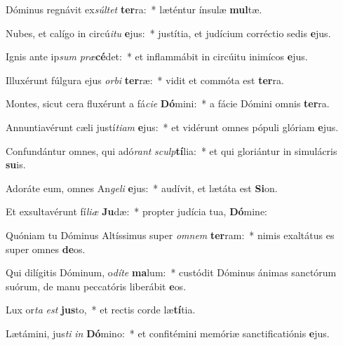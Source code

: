 \item Dóminus regnávit ex\textit{súl}\textit{tet} \textbf{ter}ra:~* læténtur ínsulæ \textbf{mul}tæ.
\item Nubes, et calígo in circú\textit{i}\textit{tu} \textbf{e}jus:~* justítia, et judícium corréctio sedis \textbf{e}jus.
\item Ignis ante ip\textit{sum} \textit{præ}\textbf{cé}det:~* et inflammábit in circúitu inimícos \textbf{e}jus.
\item Illuxérunt fúlgura ejus \textit{or}\textit{bi} \textbf{ter}ræ:~* vidit et commóta est \textbf{ter}ra.
\item Montes, sicut cera fluxérunt a fá\textit{ci}\textit{e} \textbf{Dó}mini:~* a fácie Dómini omnis \textbf{ter}ra.
\item Annuntiavérunt cæli justí\textit{ti}\textit{am} \textbf{e}jus:~* et vidérunt omnes pópuli glóriam \textbf{e}jus.
\item Confundántur omnes, qui adó\textit{rant} \textit{sculp}\textbf{tí}lia:~* et qui gloriántur in simulácris \textbf{su}is.
\item Adoráte eum, omnes An\textit{ge}\textit{li} \textbf{e}jus:~* audívit, et lætáta est \textbf{Si}on.
\item Et exsultavérunt fí\textit{li}\textit{æ} \textbf{Ju}dæ:~* propter judícia tua, \textbf{Dó}mine:
\item Quóniam tu Dóminus Altíssimus super \textit{om}\textit{nem} \textbf{ter}ram:~* nimis exaltátus es super omnes \textbf{de}os.
\item Qui dilígitis Dóminum, o\textit{dí}\textit{te} \textbf{ma}lum:~* custódit Dóminus ánimas sanctórum suórum, de manu peccatóris liberábit \textbf{e}os.
\item Lux or\textit{ta} \textit{est} \textbf{jus}to,~* et rectis corde læ\textbf{tí}tia.
\item Lætámini, jus\textit{ti} \textit{in} \textbf{Dó}mino:~* et confitémini memóriæ sanctificatiónis \textbf{e}jus.
